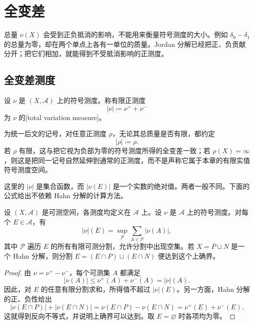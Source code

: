 \section{全变差}
\label{b1:sec:0602}


总量 \(\nu(X)\) 会受到正负抵消的影响，不能用来衡量符号测度的大小。例如 \(\delta_0-\delta_1\) 的总量为零，却在两个单点上各有一单位的质量。Jordan 分解已经把正、负贡献分开；把它们相加，就能得到不受抵消影响的正测度。

\subsection{全变差测度}
\label{b1:subsec:060201}

\begin{definition}\label{b1:def:signed-total-variation}
设 \(\nu\) 是 \((X,\mathcal A)\) 上的符号测度。称有限正测度
\[
|\nu|\coloneqq\nu^++\nu^-
\]
为 \(\nu\) 的[total variation measure]。
\end{definition}

为统一后文的记号，对任意正测度 \(\rho\)，无论其总质量是否有限，都约定
\[
|\rho|\coloneqq\rho.
\]
若 \(\rho\) 有限，这与把它视为负部为零的符号测度所得的全变差一致；若 \(\rho(X)=\infty\)，则这是把同一记号自然延伸到通常的正测度，而不是声称它属于本章的有限实值符号测度空间。

\ProseParagraphBreak

这里的 \(|\nu|\) 是集合函数，而 \(|\nu(E)|\) 是一个实数的绝对值。两者一般不同。下面的公式给出不依赖 Hahn 分解的计算方法。

\begin{proposition}\label{b1:prop:variation-partition}
设 \((X,\mathcal A)\) 是可测空间，各测度均定义在 \(\mathcal A\) 上。设 \(\nu\) 是 \(\mathcal A\) 上的符号测度。对每个 \(E\in\mathcal A\)，有
\[
|\nu|(E)=\sup_{\mathcal P}\sum_{A\in\mathcal P}|\nu(A)|,
\]
其中 \(\mathcal P\) 遍历 \(E\) 的所有有限可测分割，允许分割中出现空集。若 \(X=P\sqcup N\) 是一个 Hahn 分解，则分割 \(E=(E\cap P)\sqcup(E\cap N)\) 便达到这个上确界。
\end{proposition}
\begin{proof}
由 \(\nu=\nu^+-\nu^-\)，每个可测集 \(A\) 都满足
\[
|\nu(A)|\leq\nu^+(A)+\nu^-(A)=|\nu|(A).
\]
因此，对 \(E\) 的任意有限分割求和，所得值不超过 \(|\nu|(E)\)。另一方面，Hahn 分解的正、负性给出
\[
|\nu(E\cap P)|+|\nu(E\cap N)|
=\nu(E\cap P)-\nu(E\cap N)
=\nu^+(E)+\nu^-(E).
\]
这就得到反向不等式，并说明上确界可以达到。取 \(E=\varnothing\) 时各项均为零。
\end{proof}

